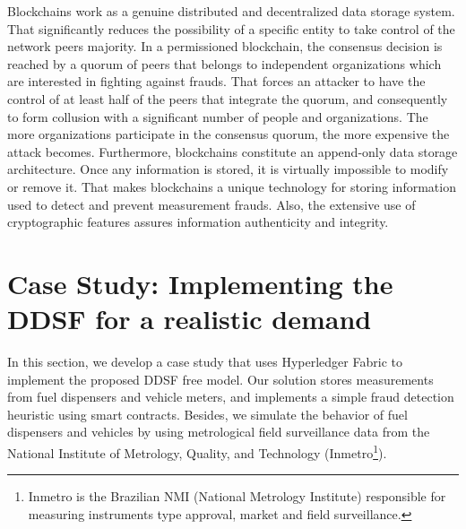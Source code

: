 \documentclass[sigplan]{acmart}
\begin{document}
Blockchains work as a genuine distributed and decentralized data storage system.
That significantly reduces the possibility of a specific entity to take control of the network peers majority.
In a permissioned blockchain, the consensus decision is reached by a quorum of peers that belongs to independent organizations which are interested in fighting against frauds.
That forces an attacker to have the control of at least half of the peers that integrate the quorum, and consequently to form collusion with a significant number of people and organizations.
The more organizations participate in the consensus quorum, the more expensive the attack becomes.
Furthermore, blockchains constitute an append-only data storage architecture.
Once any information is stored, it is virtually impossible to modify or remove it.
That makes blockchains a unique technology for storing information used to detect and prevent measurement frauds.
Also, the extensive use of cryptographic features assures information authenticity and integrity.

% 
% 
% 

\section{Case Study: Implementing the DDSF for a realistic demand}
In this section, we develop a case study that uses Hyperledger Fabric to implement the proposed DDSF free model.
Our solution stores measurements from fuel dispensers and vehicle meters, and implements a simple fraud detection heuristic using smart contracts.
Besides, we simulate the behavior of fuel dispensers and vehicles by using metrological field surveillance data from the National Institute of Metrology, Quality, and Technology (Inmetro\footnote{Inmetro is the Brazilian NMI (National Metrology Institute) responsible for measuring instruments type approval, market and field surveillance.}).
\end{document}
